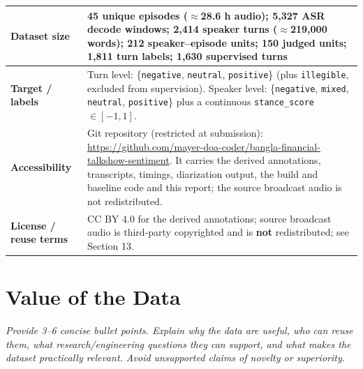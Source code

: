 \documentclass[11pt,a4paper]{article}
\newcommand{\thd}[1]{\textbf{\sffamily\small #1}}          %
\begin{document}
\begin{longtable}{|L{4.0cm}|L{11.4cm}|}
\thd{Dataset size}              & 45 unique episodes ($\approx$28.6 h audio); 5{,}327 ASR decode windows; \textbf{2{,}414 speaker turns} ($\approx$219{,}000 words); 212 speaker--episode units; 150 judged units; 1{,}811 turn labels; 1{,}630 supervised turns \\ \hline
\thd{Target / labels}           & Turn level: \{\texttt{negative}, \texttt{neutral}, \texttt{positive}\} (plus \texttt{illegible}, excluded from supervision). Speaker level: \{\texttt{negative}, \texttt{mixed}, \texttt{neutral}, \texttt{positive}\} plus a continuous \texttt{stance\_score} $\in[-1,1]$. \\ \hline
\thd{Accessibility}             & Git repository (restricted at submission): {\scriptsize\url{https://github.com/mayer-doa-coder/bangla-financial-talkshow-sentiment}}. It carries the derived annotations, transcripts, timings, diarization output, the build and baseline code and this report; the source broadcast audio is not redistributed. \\ \hline
\thd{License / reuse terms}     & CC BY 4.0 for the derived annotations; source broadcast audio is third-party copyrighted and is \textbf{not} redistributed; see Section 13. \\ \hline
\end{longtable}
\addtocounter{table}{-1}

\section{Value of the Data}

\emph{\small Provide 3--6 concise bullet points. Explain why the data are useful, who can reuse
them, what research/engineering questions they can support, and what makes the dataset
practically relevant. Avoid unsupported claims of novelty or superiority.}
\end{document}
